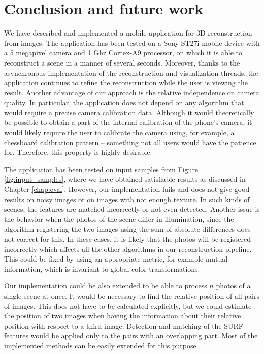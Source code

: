 \chapter*{Conclusion and future work}

We have described and implemented a mobile application for 3D reconstruction from images. 
The application has been tested on a Sony ST27i mobile device with a 5 megapixel camera and 1 Ghz Cortex-A9 processor, on which it is able to reconstruct a scene in a manner of several seconds. 
Moreover, thanks to the asynchronous implementation of the reconstruction and visualization threads, the application continues to refine the reconstruction while the user is viewing the result.
Another advantage of our approach is the relative independence on camera quality. 
In particular, the application does not depend on any algorithm that would require a precise camera calibration data. 
Although it would theoretically be possible to obtain a part of the internal calibration of the phone's camera, it would likely require the user to calibrate the camera using, for example, a chessboard calibration pattern -- something not all users would have the patience for. 
Therefore, this property is highly desirable. 

The application has been tested on input samples from Figure \ref{fig:input_samples}, where we have obtained satisfiable results as discussed in Chapter \ref{chap:eval}.
However, our implementation fails and does not give good results on noisy images or on images with not enough texture. 
In such kinds of scenes, the features are matched incorrectly or not even detected.
Another issue is the behavior when the photos of the scene differ in illumination, since the algorithm registering the two images using the sum of absolute differences does not correct for this.
In these cases, it is likely that the photos will be registered incorrectly which affects all the other algorithms in our reconstruction pipeline. 
This could be fixed by using an appropriate metric, for example mutual information, which is invariant to global  color transformations. 

Our implementation could be also extended to be able to process $n$ photos of a single scene at once. 
It would be necessary to find the relative position of all pairs of images.
This does not have to be calculated explicitly, but we could estimate the position of two images when having the information about their relative position with respect to a third image.
Detection and matching of the SURF features would be applied only to the pairs with an overlapping part.
Most of the implemented methods can be easily extended for this purpose.

